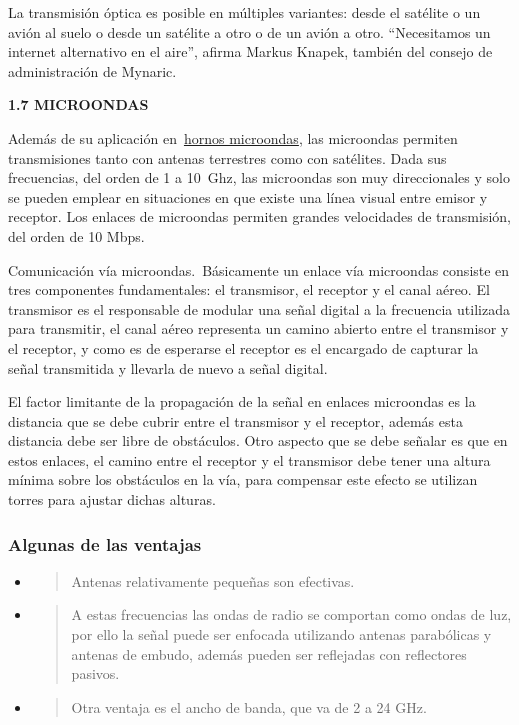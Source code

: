 La transmisión óptica es posible en múltiples variantes: desde el
satélite o un avión al suelo o desde un satélite a otro o de un avión a
otro. ``Necesitamos un internet alternativo en el aire'', afirma Markus
Knapek, también del consejo de administración de Mynaric.

\textbf{1.7 MICROONDAS}

Además de su aplicación
en~\href{https://es.wikipedia.org/wiki/Horno_microondas}{hornos
microondas}, las microondas permiten transmisiones tanto con antenas
terrestres como con satélites. Dada sus frecuencias, del orden de 1 a
10~Ghz, las microondas son muy direccionales y solo se pueden emplear en
situaciones en que existe una línea visual entre emisor y receptor. Los
enlaces de microondas permiten grandes velocidades de transmisión, del
orden de 10 Mbps.

Comunicación vía microondas.~Básicamente un enlace vía microondas
consiste en tres componentes fundamentales: el transmisor, el receptor y
el canal aéreo. El transmisor es el responsable de modular una señal
digital a la frecuencia utilizada para transmitir, el canal aéreo
representa un camino abierto entre el transmisor y el receptor, y como
es de esperarse el receptor es el encargado de capturar la señal
transmitida y llevarla de nuevo a señal digital.

El factor limitante de la propagación de la señal en enlaces microondas
es la distancia que se debe cubrir entre el transmisor y el receptor,
además esta distancia debe ser libre de obstáculos. Otro aspecto que se
debe señalar es que en estos enlaces, el camino entre el receptor y el
transmisor debe tener una altura mínima sobre los obstáculos en la vía,
para compensar este efecto se utilizan torres para ajustar dichas
alturas.

\subsubsection{Algunas de las ventajas}\label{algunas-de-las-ventajas}

\begin{itemize}
\item
  \begin{quote}
  Antenas relativamente pequeñas son efectivas.
  \end{quote}
\item
  \begin{quote}
  A estas frecuencias las ondas de radio se comportan como ondas de luz,
  por ello la señal puede ser enfocada utilizando antenas parabólicas y
  antenas de embudo, además pueden ser reflejadas con reflectores
  pasivos.
  \end{quote}
\item
  \begin{quote}
  Otra ventaja es el ancho de banda, que va de 2 a 24 GHz.
  \end{quote}
\end{itemize}

